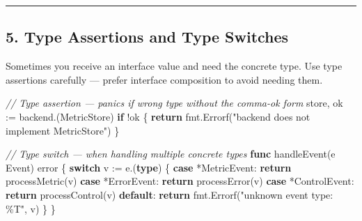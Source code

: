 \documentclass[
]{article}
\newenvironment{Shaded}{}{}
\newcommand{\CommentTok}[1]{\textcolor[rgb]{0.38,0.63,0.69}{\textit{#1}}}
\newcommand{\ControlFlowTok}[1]{\textcolor[rgb]{0.00,0.44,0.13}{\textbf{#1}}}
\newcommand{\DataTypeTok}[1]{\textcolor[rgb]{0.56,0.13,0.00}{#1}}
\newcommand{\KeywordTok}[1]{\textcolor[rgb]{0.00,0.44,0.13}{\textbf{#1}}}
\newcommand{\NormalTok}[1]{#1}
\newcommand{\OperatorTok}[1]{\textcolor[rgb]{0.40,0.40,0.40}{#1}}
\newcommand{\StringTok}[1]{\textcolor[rgb]{0.25,0.44,0.63}{#1}}
\begin{document}
\begin{center}\rule{0.5\linewidth}{0.5pt}\end{center}

\hypertarget{type-assertions-and-type-switches}{%
\subsection{5. Type Assertions and Type
Switches}\label{type-assertions-and-type-switches}}

Sometimes you receive an interface value and need the concrete type. Use
type assertions carefully --- prefer interface composition to avoid
needing them.

\begin{Shaded}
\begin{Highlighting}[]
\CommentTok{// Type assertion — panics if wrong type without the comma{-}ok form}
\NormalTok{store}\OperatorTok{,}\NormalTok{ ok }\OperatorTok{:=}\NormalTok{ backend}\OperatorTok{.(}\NormalTok{MetricStore}\OperatorTok{)}
\ControlFlowTok{if} \OperatorTok{!}\NormalTok{ok }\OperatorTok{\{}
    \ControlFlowTok{return}\NormalTok{ fmt}\OperatorTok{.}\NormalTok{Errorf}\OperatorTok{(}\StringTok{"backend does not implement MetricStore"}\OperatorTok{)}
\OperatorTok{\}}

\CommentTok{// Type switch — when handling multiple concrete types}
\KeywordTok{func}\NormalTok{ handleEvent}\OperatorTok{(}\NormalTok{e Event}\OperatorTok{)} \DataTypeTok{error} \OperatorTok{\{}
    \ControlFlowTok{switch}\NormalTok{ v }\OperatorTok{:=}\NormalTok{ e}\OperatorTok{.(}\KeywordTok{type}\OperatorTok{)} \OperatorTok{\{}
    \ControlFlowTok{case} \OperatorTok{*}\NormalTok{MetricEvent}\OperatorTok{:}
        \ControlFlowTok{return}\NormalTok{ processMetric}\OperatorTok{(}\NormalTok{v}\OperatorTok{)}
    \ControlFlowTok{case} \OperatorTok{*}\NormalTok{ErrorEvent}\OperatorTok{:}
        \ControlFlowTok{return}\NormalTok{ processError}\OperatorTok{(}\NormalTok{v}\OperatorTok{)}
    \ControlFlowTok{case} \OperatorTok{*}\NormalTok{ControlEvent}\OperatorTok{:}
        \ControlFlowTok{return}\NormalTok{ processControl}\OperatorTok{(}\NormalTok{v}\OperatorTok{)}
    \ControlFlowTok{default}\OperatorTok{:}
        \ControlFlowTok{return}\NormalTok{ fmt}\OperatorTok{.}\NormalTok{Errorf}\OperatorTok{(}\StringTok{"unknown event type: \%T"}\OperatorTok{,}\NormalTok{ v}\OperatorTok{)}
    \OperatorTok{\}}
\OperatorTok{\}}
\end{Highlighting}
\end{Shaded}
\end{document}
